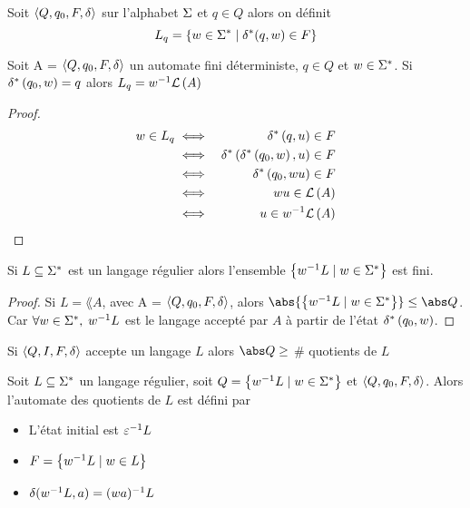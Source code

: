 \begin{definition}
	Soit $\langle Q, q_0, F, \delta \rangle$ sur l'alphabet $\Sigma$ et $q \in Q$ alors on définit
	$$ L_q = \left\{w \in \Sigma^{*} \mid \delta^{*} (q,w) \in F\right\} $$
\end{definition}


\begin{lemma}
	Soit A = $\langle Q, q_0, F, \delta \rangle$ un automate fini déterministe, $q \in Q$ et $w \in \Sigma^{*}$. Si $\delta^{*} \left(q_0,w\right) = q$ alors
	$L_q = w^{-1} \mathcal{L}\left(A\right)$
\end{lemma}

\begin{proof}
	\begin{eqnarray*}
		w \in L_q &\iff& \delta^{*} \left(q,u\right) \in F \\
		&\iff& \delta^{*} \left(\delta^{*} \left(q_0,w\right),u\right) \in F \\
		&\iff& \delta^{*} \left(q_0,wu\right) \in F \\
		&\iff& wu \in \mathcal{L}\left(A\right) \\
		&\iff& u \in w^{-1} \mathcal{L}\left(A\right)
	\end{eqnarray*}
\end{proof}

\begin{coro}
	Si $L \subseteq \Sigma^{*}$ est un langage régulier alors l'ensemble $\left\{w^{-1} L \mid w \in \Sigma^{*}\right\}$ est fini.
\end{coro}

\begin{proof}
	Si $L = \lang A$, avec A = $\langle Q, q_0, F, \delta \rangle$, alors $\abs {\setdef {\quot w L} {w \in \mots}} \leq \abs Q$. Car $\forall w \in \Sigma^{*},$ $w^{-1} L$ est
	le langage accepté par $A$ à partir de l'état $\delta^{*} \left(q_0,w\right)$.
\end{proof}

\begin{coro} \label{coro:2}
	Si $\langle Q, I, F, \delta \rangle$ accepte un langage $L$ alors $\abs Q \geq $ \# quotients de $L$
\end{coro}

\begin{definition} 

	Soit $L \subseteq \Sigma^{*}$ un langage régulier, soit $Q = \left\{w^{-1} L \mid w \in \Sigma^{*}\right\}$ et $\langle Q, q_0, F, \delta \rangle$. Alors l'automate des quotients de $L$
	est défini par

	\begin{itemize}
		\item L'état initial est $\varepsilon^{-1} L$
		\item $F = \left\{w^{-1} L \mid w \in L\right\}$
		\item $\delta (w^{-1} L, a) = (wa)^{-1} L$
	\end{itemize}
\end{definition}

